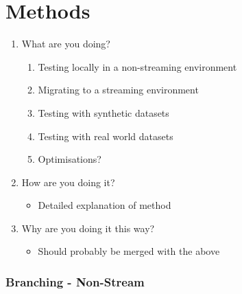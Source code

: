 \section{Methods}

\begin{enumerate}
    \item What are you doing?
          \begin{enumerate}
              \item Testing locally in a non-streaming environment
              \item Migrating to a streaming environment
              \item Testing with synthetic datasets
              \item Testing with real world datasets
              \item Optimisations?
          \end{enumerate}
    \item How are you doing it?
          \begin{itemize}
              \item Detailed explanation of method
          \end{itemize}
    \item Why are you doing it this way?
          \begin{itemize}
              \item Should probably be merged with the above
          \end{itemize}
\end{enumerate}

\subsubsection{Branching - Non-Stream}

